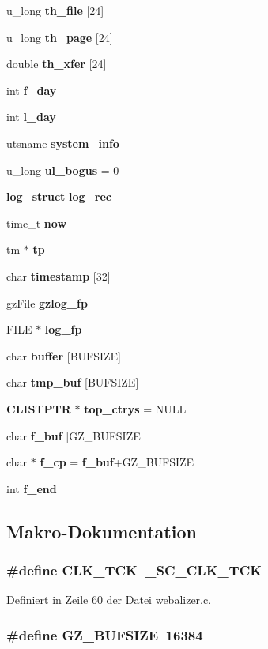 \begin{CompactItemize}
u\_\-long {\bf th\_\-file} [24]
\item 
u\_\-long {\bf th\_\-page} [24]
\item 
double {\bf th\_\-xfer} [24]
\item 
int {\bf f\_\-day}
\item 
int {\bf l\_\-day}
\item 
utsname {\bf system\_\-info}
\item 
u\_\-long {\bf ul\_\-bogus} = 0
\item 
{\bf log\_\-struct} {\bf log\_\-rec}
\item 
time\_\-t {\bf now}
\item 
tm $\ast$ {\bf tp}
\item 
char {\bf timestamp} [32]
\item 
gz\-File {\bf gzlog\_\-fp}
\item 
FILE $\ast$ {\bf log\_\-fp}
\item 
char {\bf buffer} [BUFSIZE]
\item 
char {\bf tmp\_\-buf} [BUFSIZE]
\item 
{\bf CLISTPTR} $\ast$ {\bf top\_\-ctrys} = NULL
\item 
char {\bf f\_\-buf} [GZ\_\-BUFSIZE]
\item 
char $\ast$ {\bf f\_\-cp} = {\bf f\_\-buf}+GZ\_\-BUFSIZE
\item 
int {\bf f\_\-end}
\end{CompactItemize}


\subsection{Makro-Dokumentation}
\subsubsection{\setlength{\rightskip}{0pt plus 5cm}\#define CLK\_\-TCK~\_\-SC\_\-CLK\_\-TCK}\label{webalizer_8c_03df76d1f70664d745ca8de2864e39b3}




Definiert in Zeile 60 der Datei webalizer.c.
\subsubsection{\setlength{\rightskip}{0pt plus 5cm}\#define GZ\_\-BUFSIZE~16384}\label{webalizer_8c_0ca8208fe0ebf85a7d26cb53c31f8a78}





